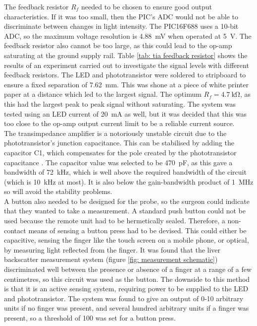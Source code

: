 The feedback resistor $R_f$ needed to be chosen to ensure good output characteristics. If it was too small, then the PIC's ADC would not be able to discriminate between changes in light intensity.  The PIC16F688 uses a 10-bit ADC, so the maximum voltage resolution is \SI{4.88}{\milli\volt} when operated at \SI{5}{\volt}. The feedback resistor also cannot be too large, as this could lead to the op-amp saturating at the ground supply rail. Table \ref{tab: tia feedback resistor} shows the results of an experiment carried out to investigate the signal levels with different feedback resistors. The LED and phototransistor were soldered to stripboard to ensure  a fixed separation of \SI{7.62}{\milli\metre}. This was shone at a piece of white printer paper at a distance which led to the largest signal. The optimum $R_f = \SI{4.7}{\kilo\ohm}$, as this had the largest peak to peak signal without saturating. The system was tested using an LED current of \SI{20}{\milli\ampere} as well, but it was decided that this was too close to the op-amp output current limit to be a reliable current source.\\

The transimpedance amplifier is a notoriously unstable circuit due to the phototransistor's junction capacitance. This can be stabilised by adding the capacitor C1, which compensates for the pole created by the phototransistor capacitance \cite{tia_stability}. The capacitor value was selected to be \SI{470}{\pico\farad}, as this gave a bandwidth of \SI{72}{\kilo\hertz}, which is well above the required bandwidth of the circuit (which is \SI{10}{\kilo\hertz} at most). It is also below the gain-bandwidth product of \SI{1}{\mega\hertz} so will avoid the stability problems.\\

A button also needed to be designed for the probe, so the surgeon could indicate that they wanted to take a measurement. A standard push button could not be used because the remote unit had to be hermetically sealed. Therefore, a non-contact means of sensing a button press had to be devised. This could either be capacitive, sensing the finger like the touch screen on a mobile phone, or optical, by measuring light reflected from the finger. It was found that the liver backscatter measurement system (figure \ref{fig: measurement schematic}) discriminated well between the presence or absence of a finger at a range of a few centimetres, so this circuit was used as the button. The downside to this method is that it is an active sensing system, requiring power to be supplied to the LED and phototransistor. The system was found to give an output of 0-10 arbitrary units if no finger was present, and several hundred arbitrary units if a finger was present, so a threshold of 100 was set for a button press. \\

